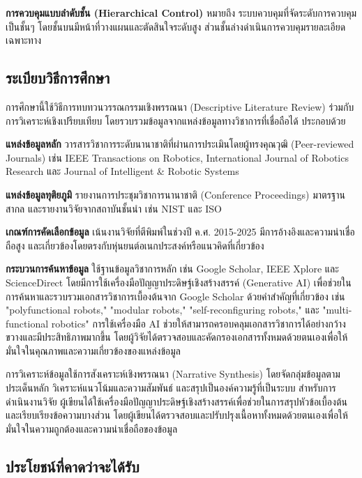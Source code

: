 \documentclass[a4paper]{article}
\begin{document}
\textbf{การควบคุมแบบลำดับชั้น (Hierarchical Control)} หมายถึง ระบบควบคุมที่จัดระดับการควบคุมเป็นชั้นๆ โดยชั้นบนมีหน้าที่วางแผนและตัดสินใจระดับสูง ส่วนชั้นล่างดำเนินการควบคุมรายละเอียดเฉพาะทาง

\subsection{ระเบียบวิธีการศึกษา}

การศึกษานี้ใช้วิธีการทบทวนวรรณกรรมเชิงพรรณนา (Descriptive Literature Review) ร่วมกับการวิเคราะห์เชิงเปรียบเทียบ โดยรวบรวมข้อมูลจากแหล่งข้อมูลทางวิชาการที่เชื่อถือได้ ประกอบด้วย

\textbf{แหล่งข้อมูลหลัก} วารสารวิชาการระดับนานาชาติที่ผ่านการประเมินโดยผู้ทรงคุณวุฒิ (Peer-reviewed Journals) เช่น IEEE Transactions on Robotics, International Journal of Robotics Research และ Journal of Intelligent \& Robotic Systems

\textbf{แหล่งข้อมูลทุติยภูมิ} รายงานการประชุมวิชาการนานาชาติ (Conference Proceedings) มาตรฐานสากล และรายงานวิจัยจากสถาบันชั้นนำ เช่น NIST และ ISO

\textbf{เกณฑ์การคัดเลือกข้อมูล} เน้นงานวิจัยที่ตีพิมพ์ในช่วงปี ค.ศ. 2015-2025 มีการอ้างอิงและความน่าเชื่อถือสูง และเกี่ยวข้องโดยตรงกับหุ่นยนต์อเนกประสงค์หรือแนวคิดที่เกี่ยวข้อง

\textbf{กระบวนการค้นหาข้อมูล} ใช้ฐานข้อมูลวิชาการหลัก เช่น Google Scholar, IEEE Xplore และ ScienceDirect โดยมีการใช้เครื่องมือปัญญาประดิษฐ์เชิงสร้างสรรค์ (Generative AI) เพื่อช่วยในการค้นหาและรวบรวมเอกสารวิชาการเบื้องต้นจาก Google Scholar ด้วยคำสำคัญที่เกี่ยวข้อง เช่น "polyfunctional robots," "modular robots," "self-reconfiguring robots," และ "multi-functional robotics" การใช้เครื่องมือ AI ช่วยให้สามารถครอบคลุมเอกสารวิชาการได้อย่างกว้างขวางและมีประสิทธิภาพมากขึ้น โดยผู้วิจัยได้ตรวจสอบและคัดกรองเอกสารทั้งหมดด้วยตนเองเพื่อให้มั่นใจในคุณภาพและความเกี่ยวข้องของแหล่งข้อมูล

การวิเคราะห์ข้อมูลใช้การสังเคราะห์เชิงพรรณนา (Narrative Synthesis) โดยจัดกลุ่มข้อมูลตามประเด็นหลัก วิเคราะห์แนวโน้มและความสัมพันธ์ และสรุปเป็นองค์ความรู้ที่เป็นระบบ สำหรับการดำเนินงานวิจัย ผู้เขียนได้ใช้เครื่องมือปัญญาประดิษฐ์เชิงสร้างสรรค์เพื่อช่วยในการสรุปหัวข้อเบื้องต้นและเรียบเรียงข้อความบางส่วน โดยผู้เขียนได้ตรวจสอบและปรับปรุงเนื้อหาทั้งหมดด้วยตนเองเพื่อให้มั่นใจในความถูกต้องและความน่าเชื่อถือของข้อมูล

\subsection{ประโยชน์ที่คาดว่าจะได้รับ}
\end{document}
